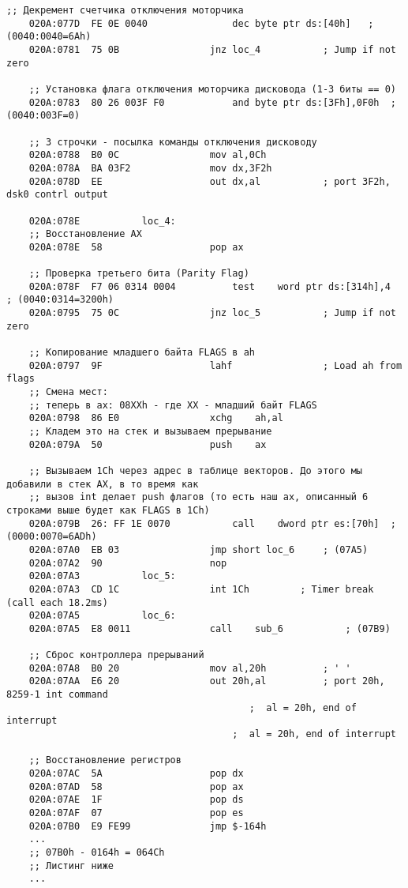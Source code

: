 \documentclass[a4paper,12pt]{bmstu}
\begin{document}
\begin{lstlisting}[style={asm},label={lst:INT8H}]
    ;; Декремент счетчика отключения моторчика
    020A:077D  FE 0E 0040				dec	byte ptr ds:[40h]	; (0040:0040=6Ah)
    020A:0781  75 0B				jnz	loc_4			; Jump if not zero

    ;; Установка флага отключения моторчика дисковода (1-3 биты == 0)
    020A:0783  80 26 003F F0			and	byte ptr ds:[3Fh],0F0h	; (0040:003F=0)

    ;; 3 строчки - посылка команды отключения дисководу
    020A:0788  B0 0C				mov	al,0Ch
    020A:078A  BA 03F2				mov	dx,3F2h
    020A:078D  EE					out	dx,al			; port 3F2h, dsk0 contrl output

    020A:078E			loc_4:
    ;; Восстановление AX
    020A:078E  58					pop	ax

    ;; Проверка третьего бита (Parity Flag)
    020A:078F  F7 06 0314 0004			test	word ptr ds:[314h],4	; (0040:0314=3200h)
    020A:0795  75 0C				jnz	loc_5			; Jump if not zero

    ;; Копирование младшего байта FLAGS в ah
    020A:0797  9F					lahf				; Load ah from flags
    ;; Смена мест:
    ;; теперь в ax: 08XXh - где XX - младший байт FLAGS
    020A:0798  86 E0				xchg	ah,al
    ;; Кладем это на стек и вызываем прерывание
    020A:079A  50					push	ax

    ;; Вызываем 1Сh через адрес в таблице векторов. До этого мы добавили в стек AX, в то время как
    ;; вызов int делает push флагов (то есть наш ax, описанный 6 строками выше будет как FLAGS в 1Ch)
    020A:079B  26: FF 1E 0070			call	dword ptr es:[70h]	; (0000:0070=6ADh)
    020A:07A0  EB 03				jmp	short loc_6		; (07A5)
    020A:07A2  90					nop
    020A:07A3			loc_5:
    020A:07A3  CD 1C				int	1Ch			; Timer break (call each 18.2ms)
    020A:07A5			loc_6:
    020A:07A5  E8 0011				call	sub_6			; (07B9)

    ;; Сброс контроллера прерываний
    020A:07A8  B0 20				mov	al,20h			; ' '
    020A:07AA  E6 20				out	20h,al			; port 20h, 8259-1 int command
                                           ;  al = 20h, end of interrupt
										;  al = 20h, end of interrupt

    ;; Восстановление регистров
    020A:07AC  5A					pop	dx
    020A:07AD  58					pop	ax
    020A:07AE  1F					pop	ds
    020A:07AF  07					pop	es
    020A:07B0  E9 FE99				jmp	$-164h
    ...
    ;; 07B0h - 0164h = 064Ch
    ;; Листинг ниже
    ...

\end{lstlisting}
\clearpage
\end{document}
